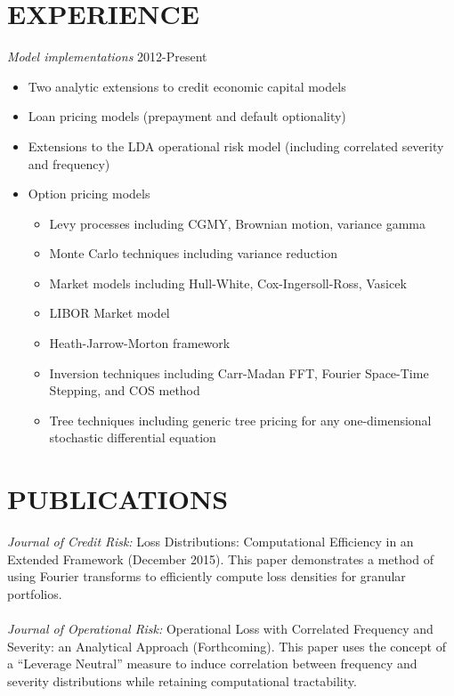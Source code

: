 \documentclass{res}
\begin{document}
\begin{resume}
\section{EXPERIENCE} {\sl Model implementations} \hfill 2012-Present 
\begin{itemize}
\item Two analytic extensions to credit economic capital models 
\item Loan pricing models (prepayment and default optionality)
\item Extensions to the LDA operational risk model (including correlated severity and frequency)
\item Option pricing models 
\begin{itemize}
\item Levy processes including CGMY, Brownian motion, variance gamma
\item Monte Carlo techniques including variance reduction
\item Market models including Hull-White, Cox-Ingersoll-Ross, Vasicek
\item LIBOR Market model
\item Heath-Jarrow-Morton framework
\item Inversion techniques including Carr-Madan FFT, Fourier Space-Time Stepping, and COS method
\item Tree techniques including generic tree pricing for any one-dimensional stochastic differential equation
\end{itemize}
\end{itemize}

\section{PUBLICATIONS} {\sl Journal of Credit Risk:} Loss Distributions: Computational Efficiency in an Extended Framework (December 2015).  This paper demonstrates a method of using Fourier transforms to efficiently compute loss densities for granular portfolios.
\\
\\
{\sl Journal of Operational Risk:} Operational Loss with Correlated Frequency and Severity: an Analytical Approach (Forthcoming).  This paper uses the concept of a ``Leverage Neutral'' measure to induce correlation between frequency and severity distributions while retaining computational tractability.

\end{resume}
\end{document}
